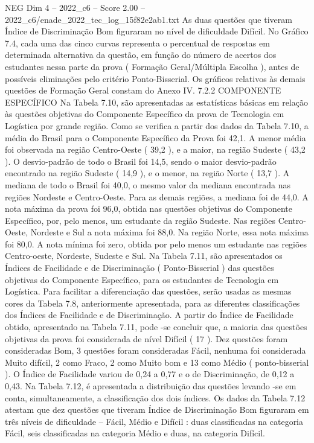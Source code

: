 \begin{textsample}{NEG Dim 4 – 2022\_c6 – Score 2.00 – 2022\_c6/enade\_2022\_tec\_log\_15f82e2ab1.txt}
As duas questões que tiveram Índice de Discriminação Bom figuraram no nível de dificuldade Difícil.
No Gráfico 7.4, cada uma das cinco curvas representa o percentual de respostas em determinada alternativa da questão, em função do número de acertos dos estudantes nessa parte da prova ( Formação Geral/Múltipla Escolha ), antes de possíveis eliminações pelo critério Ponto-Bisserial.
Os gráficos relativos às demais questões de Formação Geral constam do Anexo IV. 7.2.2 COMPONENTE ESPECÍFICO Na Tabela 7.10, são apresentadas as estatísticas básicas em relação às questões objetivas do Componente Específico da prova de Tecnologia em Logística por grande região.
Como se verifica a partir dos dados da Tabela 7.10, a média do Brasil para o Componente Específico da Prova foi 42,1.
A menor média foi observada na região Centro-Oeste ( 39,2 ), e a maior, na região Sudeste ( 43,2 ).
O desvio-padrão de todo o Brasil foi 14,5, sendo o maior desvio-padrão encontrado na região Sudeste ( 14,9 ), e o menor, na região Norte ( 13,7 ).
A mediana de todo o Brasil foi 40,0, o mesmo valor da mediana encontrada nas regiões Nordeste e Centro-Oeste.
Para as demais regiões, a mediana foi de 44,0.
A nota máxima da prova foi 96,0, obtida nas questões objetivas do Componente Específico, por, pelo menos, um estudante da região Sudeste.
Nas regiões Centro-Oeste, Nordeste e Sul a nota máxima foi 88,0.
Na região Norte, essa nota máxima foi 80,0.
A nota mínima foi zero, obtida por pelo menos um estudante nas regiões Centro-oeste, Nordeste, Sudeste e Sul.
Na Tabela 7.11, são apresentados os Índices de Facilidade e de Discriminação ( Ponto-Bisserial ) das questões objetivas do Componente Específico, para os estudantes de Tecnologia em Logística.
Para facilitar a diferenciação das questões, serão usadas as mesmas cores da Tabela 7.8, anteriormente apresentada, para as diferentes classificações dos Índices de Facilidade e de Discriminação.
A partir do Índice de Facilidade obtido, apresentado na Tabela 7.11, pode -se concluir que, a maioria das questões objetivas da prova foi considerada de nível Difícil ( 17 ).
Dez questões foram consideradas Bom, 3 questões foram consideradas Fácil, nenhuma foi considerada Muito difícil, 2 como Fraco, 2 como Muito bom e 13 como Médio ( ponto-bisserial ).
O Índice de Facilidade variou de 0,24 a 0,77 e o de Discriminação, de 0,12 a 0,43.
Na Tabela 7.12, é apresentada a distribuição das questões levando -se em conta, simultaneamente, a classificação dos dois índices.
Os dados da Tabela 7.12 atestam que dez questões que tiveram Índice de Discriminação Bom figuraram em três níveis de dificuldade – Fácil, Médio e Difícil : duas classificadas na categoria Fácil, seis classificadas na categoria Médio e duas, na categoria Difícil.

\end{textsample}
